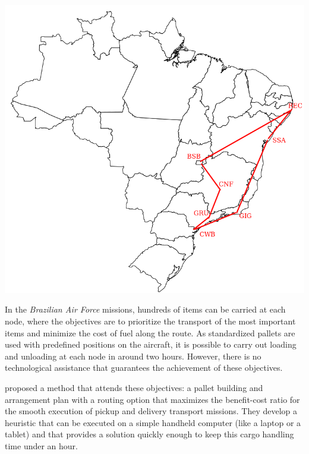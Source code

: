 \documentclass[preprint,authoryear]{elsarticle}
\begin{document}
\begin{table}[H]
\begin{minipage}{0.45\linewidth}
	\end{minipage}\hfill %
	\begin{minipage}{0.50\linewidth}
		\centering
		\includegraphics[scale=0.25]{Images/nodes.png}
		\label{fig:nodes}		
	\end{minipage}
\end{table}
\label{hypotheses}

In the {\it Brazilian Air Force}\/ missions, hundreds of items can be carried at each node, where the objectives are to prioritize the transport of the most important items and minimize the cost of fuel along the route. As standardized pallets are used with predefined positions on the aircraft, it is possible to carry out loading and unloading at each node in around two hours. However, there is no technological assistance that guarantees the achievement of these objectives.

\cite{MesquitaSanches2023} proposed a method that attends these objectives: a pallet building and arrangement plan with a routing option that maximizes the benefit-cost ratio for the smooth execution of pickup and delivery transport missions. They develop a heuristic that can be executed on a simple handheld computer (like a laptop or a tablet) and that provides a solution quickly enough to keep this cargo handling time under an hour.
\end{document}
